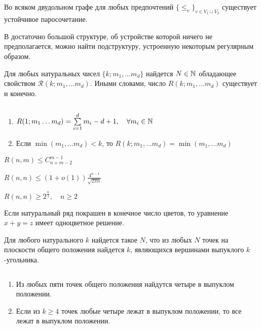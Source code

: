 \documentclass[12pt]{article}
\begin{document}
\begin{thm}
    Во всяком двудольном графе для любых предпочтений $\{ \le_v\}_{v \in V_1 \cup V_2}$ существует устойчивое паросочетание.
\end{thm}
\begin{thesis}[Рамсей]
    В достаточно большой структуре, об устройстве которой ничего не предполагается, можно найти подструктуру, устроенную некоторым регулярным образом. 
\end{thesis}
\begin{thm}[Рамсей, 1930]
    Для любых натуральных чисел $\{k; m_1, \ldots m_d\}$ найдется $N \in  \mathbb{N}$ обладающее свойством $\mathcal{R}(k; m_1, \ldots m_d)$. Иными словами, число $R(k; m_1, \ldots m_d)$ существует и конечно.
\end{thm}
\begin{st}
    $ $
    \begin{enumerate}
	\item $R(1; m_1 \ldots m_d) = \sum\limits_{i = 1}^{d} m_i - d + 1 , \quad \forall m_i \in \mathbb{N}$
	\item Если $\min(m_1, \ldots m_d) < k$, то $R(k; m_1, \ldots m_d) = \min(m_1, \ldots m_d)$
    \end{enumerate}
\end{st}
\begin{thm}
    $R(n, m) \le C_{n+m-2}^{m-1}$
\end{thm}
\begin{cor}
    $R(n, n) \le (1+o(1)) \frac{4^{n-1}}{\sqrt{2\pi n}}$
\end{cor}
\begin{thm}
    $R(n, n) \ge 2^{\frac{n}{2}}, \quad n \ge 2$
\end{thm}
\begin{thm}[Шур, 1917]
    Если натуральный ряд покрашен в конечное число цветов, то уравнение $x+y=z$ имеет одноцветное решение.
\end{thm}
\begin{thm}
    Для любого натурального $k$ найдется такое $N$, что из любых $N$ точек на плоскости общего положения найдется $k$, являющихся вершинами выпуклого $k$-угольника.
\end{thm}
\begin{st}
    $ $
    \begin{enumerate}
        \item Из любых пяти точек общего положения найдутся четыре в выпуклом положении.
	\item Если из $k \ge 4$ точек любые четыре лежат в выпуклом положении, то все лежат в выпуклом положении.
    \end{enumerate}
\end{st}
\end{document}

